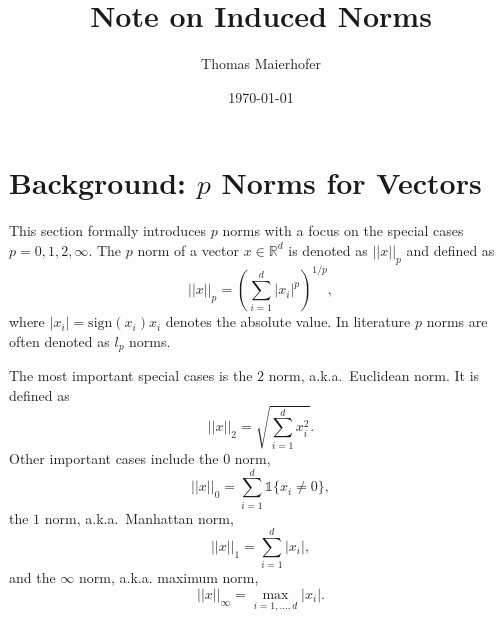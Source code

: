 \documentclass{article}
\title{Note on Induced Norms}
\author{Thomas Maierhofer}
\date{\today}
\begin{document}
\newcommand{\Prob}{\mathbb{P}}
\newcommand{\V}{\mathbb{V}}
\newcommand{\Cov}{\text{Cov}}
\newcommand{\E}{\mathbb{E}}
\newcommand{\R}{\mathbb{R}}
\newcommand{\1}{\mathbb{1}}
\newcommand{\LL}{\mathcal{L}}
\newcommand{\F}{\mathcal{F}}
\newcommand{\iid}{\overset{\text{iid}}{\sim}}
\newcommand{\SUM}{\sum_{i=1}^n}
\newcommand{\PROD}{\prod_{i=1}^n}

\maketitle

\section{Background: $p$ Norms for Vectors}
This section formally introduces $p$ norms with a focus on the special cases $ p = 0, 1, 2, \infty$.
The $p$ norm of a vector $x \in \R^d$ is denoted as $||x||_p$ and defined as
$$||x||_p = \left(\sum_{i = 1}^d |x_i|^p \right)^{1/p},$$
where $|x_i| = \text{sign}(x_i)x_i$ denotes the absolute value. In literature $p$ norms are often denoted as $l_p$ norms.

The most important special cases is the $2$ norm, a.k.a.\ Euclidean norm. It is defined as
$$||x||_2 = \sqrt{\sum_{i = 1}^d x_i^2}.$$
Other important cases include the $0$ norm,
$$||x||_0 = \sum_{i = 1}^d \1\{x_i \neq 0\},$$
the $1$ norm, a.k.a.\ Manhattan norm,
$$||x||_1 = \sum_{i = 1}^d |x_i|,$$
and the $\infty$ norm, a.k.a. maximum norm,
$$||x||_\infty = \max_{i = 1, \ldots, d} |x_i|.$$
\end{document}
